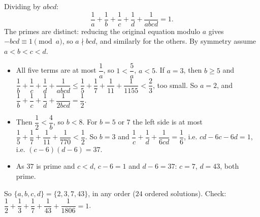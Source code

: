 Dividing by $abcd$:
\[
\dfrac{1}{a}+\dfrac{1}{b}+\dfrac{1}{c}+\dfrac{1}{d}+\dfrac{1}{abcd}=1 .
\]
The primes are distinct: reducing the original equation modulo $a$ gives $-bcd\equiv1\pmod a$, so $a\nmid bcd$, and similarly for the others. By symmetry assume $a<b<c<d$.
\begin{itemize}
\item All five terms are at most $\dfrac{1}{a}$, so $1<\dfrac{5}{a}$, $a<5$. If $a=3$, then $b\ge5$ and $\dfrac{1}{b}+\dfrac{1}{c}+\dfrac{1}{d}+\dfrac{1}{abcd}\le\dfrac{1}{5}+\dfrac{1}{7}+\dfrac{1}{11}+\dfrac{1}{1155}<\dfrac{2}{3}$, too small. So $a=2$, and $\dfrac{1}{b}+\dfrac{1}{c}+\dfrac{1}{d}+\dfrac{1}{2bcd}=\dfrac{1}{2}$.
\item Then $\dfrac{1}{2}<\dfrac{4}{b}$, so $b<8$. For $b=5$ or $7$ the left side is at most $\dfrac{1}{5}+\dfrac{1}{7}+\dfrac{1}{11}+\dfrac{1}{770}<\dfrac{1}{2}$. So $b=3$ and $\dfrac{1}{c}+\dfrac{1}{d}+\dfrac{1}{6cd}=\dfrac{1}{6}$, i.e. $cd-6c-6d=1$, i.e. $(c-6)(d-6)=37$.
\item As $37$ is prime and $c<d$, $c-6=1$ and $d-6=37$: $c=7$, $d=43$, both prime.
\end{itemize}
So $\{a,b,c,d\}=\boxed{\{2,3,7,43\}}$, in any order ($24$ ordered solutions). Check: $\dfrac{1}{2}+\dfrac{1}{3}+\dfrac{1}{7}+\dfrac{1}{43}+\dfrac{1}{1806}=1$.
